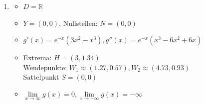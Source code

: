 \begin{enumerate}
\begin{enumerate}
                \item \begin{itemize}
                    \item  $D = \mathbb{R}$ 
                    \item $Y = (0, 0)$, Nullstellen: $N = (0,0)$
                    \item $g'(x) = e^{-x} (3x^2-x^3), g''(x) = e^{-x} (x^3-6x^2+6x)$
                    \item Extrema: $ H=(3, 1.34)$ \\
                        Wendepunkte: $W_1 \approx (1.27, 0.57), W_2 \approx(4.73, 0.93)$ \\
                        Sattelpunkt $S=(0,0)$
                    \item $\lim\limits_{x \to \infty} g(x) =0, \lim\limits_{x \to -\infty} g(x) = -\infty$
                \end{itemize}
    \end{enumerate}
 
    
\end{enumerate} 
